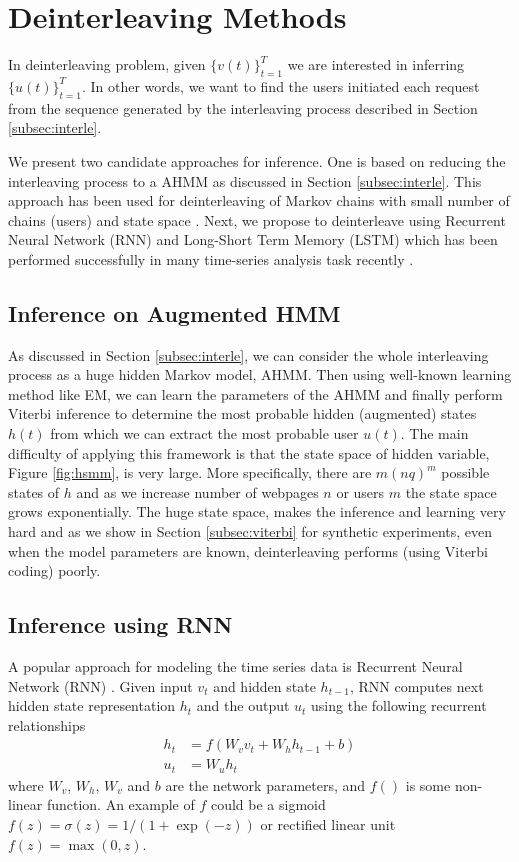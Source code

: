 \section{Deinterleaving Methods}
	In deinterleaving problem, given $\{v(t)\}_{t=1}^T$ we are interested in inferring $\{u(t)\}_{t=1}^T$.
	In other words, we want to find the users initiated each request from the sequence generated by the interleaving process described in Section \ref{subsec:interle}. 
	
	We present two candidate approaches for inference. 
	One is based on reducing the interleaving process to a AHMM as discussed in Section \ref{subsec:interle}. 
	This approach has been used for deinterleaving of Markov chains with small number of chains (users) and state space \cite{minot2014separation}. 
	Next, we propose to deinterleave using Recurrent Neural Network (RNN) and Long-Short Term Memory (LSTM) which has been performed successfully in many time-series analysis task recently \cite{chung2014empirical,Hochreiter}. 
	
	\subsection{Inference on Augmented HMM}
	As discussed in Section \ref{subsec:interle}, we can consider the whole interleaving process as a huge hidden Markov model, AHMM. 
	Then using well-known learning method like EM, we can learn the parameters of the AHMM and finally perform Viterbi inference to determine the most probable hidden (augmented) states $h(t)$ from which we can extract the most probable user $u(t)$. 
	The main difficulty of applying this framework is that the state space of hidden variable, Figure \ref{fig:hsmm}, is very large.
	More specifically, there are $m (nq)^m$ possible states of $h$ and as we increase number of webpages $n$ or users $m$ the state space grows exponentially. 
	The huge state space, makes the inference and learning very hard and as we show in Section \ref{subsec:viterbi} for synthetic experiments, even when the model parameters are known, deinterleaving performs (using Viterbi coding) poorly. 
	
	\subsection{Inference using RNN}
	A popular approach for modeling the time series data is Recurrent Neural Network (RNN) \cite{lecun2015deep}. Given input $v_t$ and hidden state $h_{t-1}$, RNN computes next hidden state representation $h_t$ and the output $u_t$ using the following recurrent relationships
	\begin{align}
	\label{eq:rnn}
	h_{t} &= f(W_v v_{t} + W_h h_{t - 1} + b)\\
	u_t &= W_u h_t
	\end{align}
	where $W_v$, $W_h$, $W_v$ and $b$ are the network parameters, and $f()$ is some non-linear function. An example of $f$ could be a sigmoid $f(z) = \sigma(z) = 1/(1+\exp(-z))$ or rectified linear unit $f(z) = \max(0,z)$. 
	
